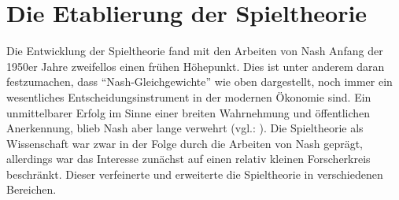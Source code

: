 \section{Die Etablierung der Spieltheorie}

Die Entwicklung der Spieltheorie fand mit den Arbeiten von Nash Anfang der 1950er Jahre zweifellos einen frühen Höhepunkt. Dies ist unter anderem daran festzumachen, dass "`Nash-Gleichgewichte"' wie oben dargestellt, noch immer ein wesentliches Entscheidungsinstrument in der modernen Ökonomie sind. Ein unmittelbarer Erfolg im Sinne einer breiten Wahrnehmung und öffentlichen Anerkennung, blieb Nash aber lange verwehrt (vgl.: \textcite{Nash2004}). Die Spieltheorie als Wissenschaft war zwar in der Folge durch die Arbeiten von Nash geprägt, allerdings war das Interesse zunächst auf einen relativ kleinen Forscherkreis beschränkt. Dieser verfeinerte und erweiterte die Spieltheorie in verschiedenen Bereichen. 


